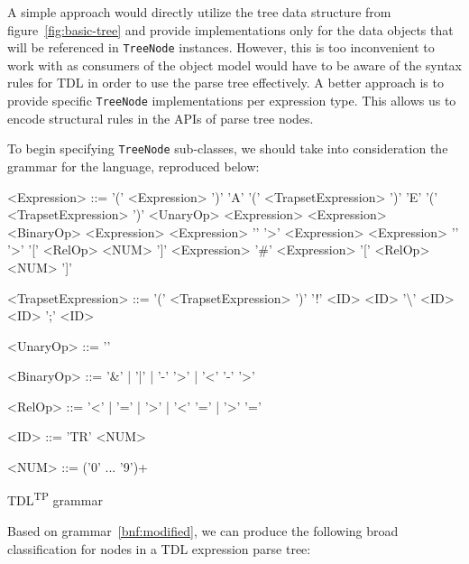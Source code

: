\documentclass[12pt,oneside,a4paper,notitlepage]{report}
\newcommand{\texttilde}{\raisebox{0.5ex}{\texttildelow}}
\begin{document}
	\par A simple approach would directly utilize the tree data structure from figure~\ref{fig:basic-tree} and provide implementations only for the data objects that will be referenced in \texttt{TreeNode} instances. However, this is too inconvenient to work with as consumers of the object model would have to be aware of the syntax rules for TDL in order to use the parse tree effectively. A better approach is to provide specific \texttt{TreeNode} implementations per expression type. This allows us to encode structural rules in the APIs of parse tree nodes.

	\newpage

	\par To begin specifying \texttt{TreeNode} sub-classes, we should take into consideration the grammar for the language, reproduced below:

	\begin{GrammarWrapper}
		\begin{grammar}
			<Expression>	::=	'(' <Expression> ')'
			\alt 				'A' '(' <TrapsetExpression> ')'
			\alt 				'E' '(' <TrapsetExpression> ')'
			\alt 				<UnaryOp> <Expression>
			\alt 				<Expression> <BinaryOp> <Expression>
			\alt 				<Expression> '\texttilde' '\textgreater' <Expression> 
			\alt 				<Expression> '\texttilde' '\textgreater' '[' <RelOp> <NUM> ']' <Expression> 
			\alt 				'\#' <Expression> '[' <RelOp> <NUM> ']'
			
			<TrapsetExpression>	::=	'(' <TrapsetExpression> ')'
			\alt						'!' <ID>
			\alt 						<ID> '\textbackslash' <ID>
			\alt						<ID> ';' <ID>
			
			<UnaryOp>	::= '\texttilde'
			
			<BinaryOp>	::= '\&' | '|' | '-' '\textgreater' | '\textless' '-' '\textgreater'
			
			<RelOp> 	::= '\textless' | '=' | '\textgreater' | '\textless' '=' | '\textgreater' '='
			
			<ID> 		::= 'TR' <NUM>
			
			<NUM> 		::= ('0' ... '9')+
		\end{grammar}
		\caption{TDL\textsuperscript{TP} grammar}\label{bnf:modified}
	\end{GrammarWrapper}

	\newpage

	\par Based on grammar~\ref{bnf:modified}, we can produce the following broad classification for nodes in a TDL expression parse tree:
\end{document}
